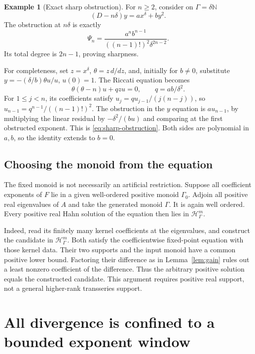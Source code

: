 \documentclass[11pt,a4paper]{article}
\numberwithin{equation}{section}
\theoremstyle{definition}
\newtheorem{example}[theorem]{Example}
\theoremstyle{remark}
\newcommand{\N}{\mathbb N}
\newcommand{\G}{\Gamma}
\newcommand{\HH}{\mathscr H}
\begin{document}
\begin{example}[Exact sharp obstruction]\label{ex:sharp}
For $n\geq2$, consider on $\G=\delta\N$
\begin{equation}\label{eq:sharp}
 (D-n\delta)y=a x^\delta+b y^2.
\end{equation}
The obstruction at $n\delta$ is exactly
\begin{equation}\label{eq:sharp-obstruction}
 \Psi_n=\frac{a^n b^{n-1}}{((n-1)!)^2\delta^{2n-2}}.
\end{equation}
Its total degree is $2n-1$, proving sharpness.

For completeness, set $z=x^\delta$, $\theta=z\,d/dz$, and, initially
for $b\ne0$, substitute $y=-(\delta/b)\theta u/u$, $u(0)=1$.
The Riccati equation becomes
\[
 \theta(\theta-n)u+qzu=0,\qquad q=ab/\delta^2.
\]
For $1\leq j<n$, its coefficients satisfy
$u_j=q u_{j-1}/(j(n-j))$, so
$u_{n-1}=q^{n-1}/((n-1)!)^2$.
The obstruction in the $y$ equation is $a u_{n-1}$, by multiplying the
linear residual by $-\delta^2/(bu)$ and comparing at the first obstructed
exponent. This is \eqref{eq:sharp-obstruction}.
Both sides are polynomial in $a,b$, so the identity extends to $b=0$.
\end{example}

\subsection{Choosing the monoid from the equation}
The fixed monoid is not necessarily an artificial restriction. Suppose
all coefficient exponents of $F$ lie in a given well-ordered positive
monoid $\G_0$. Adjoin all positive real eigenvalues of $A$ and take the
generated monoid $\G$. It is again well ordered. Every positive real Hahn
solution of the equation then lies in $\HH_\G^m$.

Indeed, read its finitely many kernel coefficients at the eigenvalues,
and construct the candidate in $\HH_\G^m$. Both satisfy the coefficientwise
fixed-point equation with those kernel data. Their two supports and the
input monoid have a common positive lower bound. Factoring their difference
as in Lemma~\ref{lem:gain} rules out a least nonzero coefficient of the
difference. Thus the arbitrary positive solution equals the constructed
candidate. This argument requires positive real support, not a general
higher-rank transseries support.

\section{All divergence is confined to a bounded exponent window}
\label{sec:window}
\end{document}
